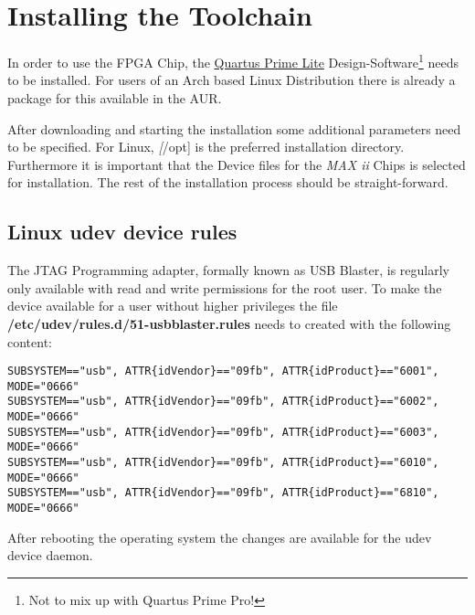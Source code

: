 \section{Installing the Toolchain}

In order to use the FPGA Chip, the \href{https://www.intel.de/content/www/de/de/collections/products/fpga/software/downloads.html}{Quartus Prime Lite} Design-Software\footnote{Not to mix up with Quartus Prime Pro!} needs to be installed. For users of an Arch based Linux Distribution there is already a package for this available in the AUR.

After downloading and starting the installation some additional parameters need to be specified. For Linux, \textit[/opt] is the preferred installation directory. Furthermore it is important that the Device files for the \textit{MAX ii} Chips is selected for installation. The rest of the installation process should be straight-forward.

\subsection{Linux udev device rules}

The JTAG Programming adapter, formally known as \glqq{}USB Blaster\grqq{}, is regularly only available with read and write permissions for the root user. To make the device available for a user without higher privileges the file \textbf{/etc/udev/rules.d/51-usbblaster.rules} needs to created with the following content:

\begin{lstlisting}
SUBSYSTEM=="usb", ATTR{idVendor}=="09fb", ATTR{idProduct}=="6001", MODE="0666"
SUBSYSTEM=="usb", ATTR{idVendor}=="09fb", ATTR{idProduct}=="6002", MODE="0666"
SUBSYSTEM=="usb", ATTR{idVendor}=="09fb", ATTR{idProduct}=="6003", MODE="0666"
SUBSYSTEM=="usb", ATTR{idVendor}=="09fb", ATTR{idProduct}=="6010", MODE="0666"
SUBSYSTEM=="usb", ATTR{idVendor}=="09fb", ATTR{idProduct}=="6810", MODE="0666"
\end{lstlisting}

After rebooting the operating system the changes are available for the udev device daemon.
